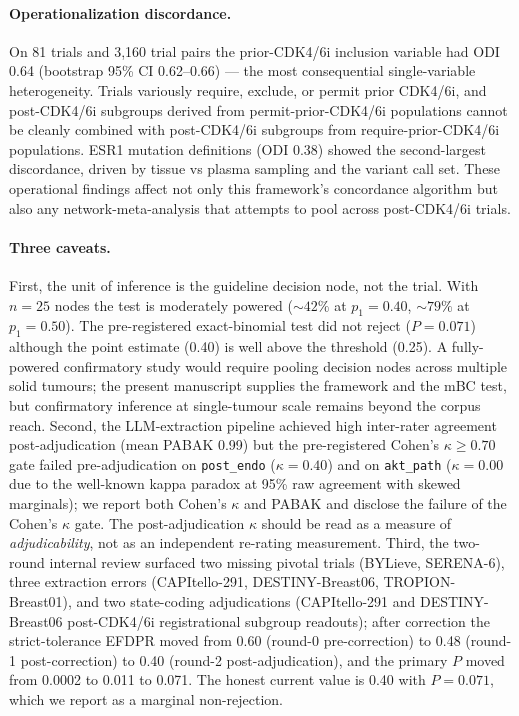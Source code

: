 \paragraph{Operationalization discordance.}
On 81 trials and 3,160 trial pairs the prior-CDK4/6i inclusion variable had ODI 0.64 (bootstrap 95\% CI 0.62--0.66) --- the most consequential single-variable heterogeneity. Trials variously require, exclude, or permit prior CDK4/6i, and post-CDK4/6i subgroups derived from permit-prior-CDK4/6i populations cannot be cleanly combined with post-CDK4/6i subgroups from require-prior-CDK4/6i populations. ESR1 mutation definitions (ODI 0.38) showed the second-largest discordance, driven by tissue vs plasma sampling and the variant call set. These operational findings affect not only this framework's concordance algorithm but also any network-meta-analysis that attempts to pool across post-CDK4/6i trials.

\paragraph{Three caveats.}
First, the unit of inference is the guideline decision node, not the trial. With $n = 25$ nodes the test is moderately powered ($\sim 42\%$ at $p_1 = 0.40$, $\sim 79\%$ at $p_1 = 0.50$). The pre-registered exact-binomial test did not reject ($P = 0.071$) although the point estimate (0.40) is well above the threshold (0.25). A fully-powered confirmatory study would require pooling decision nodes across multiple solid tumours; the present manuscript supplies the framework and the mBC test, but confirmatory inference at single-tumour scale remains beyond the corpus reach. Second, the LLM-extraction pipeline achieved high inter-rater agreement post-adjudication (mean PABAK 0.99) but the pre-registered Cohen's $\kappa \ge 0.70$ gate failed pre-adjudication on \texttt{post\_endo} ($\kappa = 0.40$) and on \texttt{akt\_path} ($\kappa = 0.00$ due to the well-known kappa paradox at 95\% raw agreement with skewed marginals); we report both Cohen's $\kappa$ and PABAK and disclose the failure of the Cohen's $\kappa$ gate. The post-adjudication $\kappa$ should be read as a measure of \emph{adjudicability}, not as an independent re-rating measurement. Third, the two-round internal review surfaced two missing pivotal trials (BYLieve, SERENA-6), three extraction errors (CAPItello-291, DESTINY-Breast06, TROPION-Breast01), and two state-coding adjudications (CAPItello-291 and DESTINY-Breast06 post-CDK4/6i registrational subgroup readouts); after correction the strict-tolerance EFDPR moved from 0.60 (round-0 pre-correction) to 0.48 (round-1 post-correction) to 0.40 (round-2 post-adjudication), and the primary $P$ moved from 0.0002 to 0.011 to 0.071. The honest current value is 0.40 with $P = 0.071$, which we report as a marginal non-rejection.

